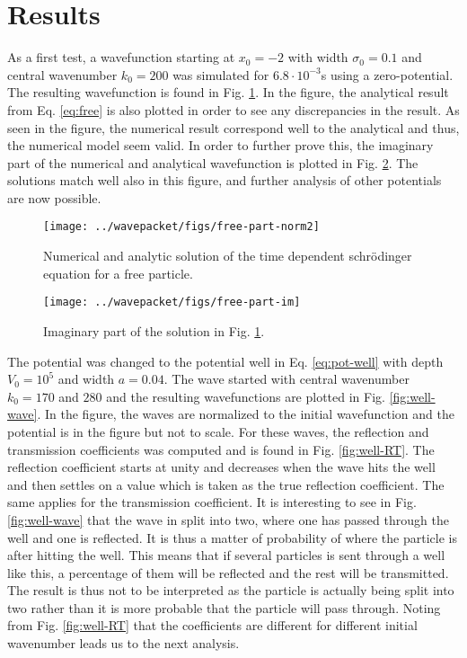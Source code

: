 \section{Results}

As a first test, a wavefunction starting at $x_0=-2$ with width $\sigma_0=0.1$ and central wavenumber $k_0=200$ was simulated for $6.8 \cdot 10^{-3}$s using a zero-potential. The resulting wavefunction is found in Fig. \ref{fig:free-norm}. In the figure, the analytical result from Eq. \eqref{eq:free} is also plotted in order to see any discrepancies in the result. As seen in the figure, the numerical result correspond well to the analytical and thus, the numerical model seem valid. In order to further prove this, the imaginary part of the numerical and analytical wavefunction is plotted in Fig. \ref{fig:free-imag}. The solutions match well also in this figure, and further analysis of other potentials are now possible.

\begin{figure}[H]
  \centering
  \texttt{[image: ../wavepacket/figs/free-part-norm2]}
  \caption{Numerical and analytic solution of the time dependent schrödinger equation for a free particle.}
  \label{fig:free-norm}
\end{figure}

\begin{figure}[H]
  \centering
  \texttt{[image: ../wavepacket/figs/free-part-im]}
  \caption{Imaginary part of the solution in Fig. \ref{fig:free-norm}.}
  \label{fig:free-imag}
\end{figure}

The potential was changed to the potential well in Eq. \eqref{eq:pot-well} with depth $V_0=10^{5}$ and width $a=0.04$. The wave started with central wavenumber $k_0 = 170$ and $280$ and the resulting wavefunctions are plotted in Fig. \ref{fig:well-wave}. In the figure, the waves are normalized to the initial wavefunction and the potential is in the figure but not to scale. For these waves, the reflection and transmission coefficients was computed and is found in Fig. \ref{fig:well-RT}. The reflection coefficient starts at unity and decreases when the wave hits the well and then settles on a value which is taken as the true reflection coefficient. The same applies for the transmission coefficient. It is interesting to see in Fig. \ref{fig:well-wave} that the wave in split into two, where one has passed through the well and one is reflected. It is thus a matter of probability of where the particle is after hitting the well. This means that if several particles is sent through a well like this, a percentage of them will be reflected and the rest will be transmitted. The result is thus not to be interpreted as the particle is actually being split into two rather than it is more probable that the particle will pass through. Noting from Fig. \ref{fig:well-RT} that the coefficients are different for different initial wavenumber leads us to the next analysis.

